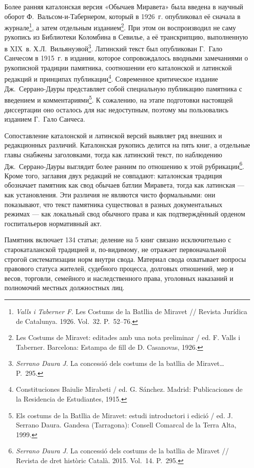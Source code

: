 Более ранняя каталонская версия «Обычаев Миравета» была введена в научный оборот Ф.~Вальсом-и-Табернером, который в 1926~г. опубликовал её сначала в журнале\footnote{\emph{Valls i Taberner F. }Les Costums de la Batllia de Miravet // Revista Jurídica de Catalunya. 1926. Vol.~32. P.~52--76.}, а затем отдельным изданием\footnote{Les Costums de Miravet: editades amb una nota preliminar / ed. F. Valls i Taberner. Barcelona: Estampa de fill de D. Casanovas, 1926.}. При этом он воспроизводил не саму рукопись из Библиотеки Коломбина в Севилье, а её транскрипцию, выполненную в XIX~в. Х.Л.~Вильянуэвой\footnote{\emph{Serrano Daura J. }La concessió dels costums de la batllia de Miravet… P.~295.}. Латинский текст был опубликован Г.~Гало Санчесом в 1915~г. в издании, которое сопровождалось вводными замечаниями о рукописной традиции памятника, соотношении его каталонской и латинской редакций и принципах публикации\footnote{Constituciones Baiulie Mirabeti / ed. G. Sánchez. Madrid: Publicaciones de la Residencia de Estudiantes, 1915.}. Современное критическое издание Дж.~Серрано-Дауры представляет собой специальную публикацию памятника с введением и комментариями\footnote{Els costums de la Batllia de Miravet: estudi introductori i edició / ed. J. Serrano Daura. Gandesa (Tarragona): Consell Comarcal de la Terra Alta, 1999.}. К сожалению, на этапе подготовки настоящей диссертации оно осталось для нас недоступным, поэтому мы пользовались изданием Г.~Гало Санчеса.

Сопоставление каталонской и латинской версий выявляет ряд внешних и редакционных различий. Каталонская рукопись делится на пять книг, а отдельные главы снабжены заголовками, тогда как латинский текст, по наблюдению Дж.~Серрано-Дауры выглядит более ранним по отношению к этой рубрикации\footnote{\emph{Serrano Daura J.} La concessió dels costums de la batllia de Miravet // Revista de dret històric Català. 2015. Vol.~14. P.~295.}. Кроме того, заглавия двух редакций не совпадают: каталонская традиция обозначает памятник как свод обычаев батлии Миравета, тогда как латинская --- как установления. Эти различия не являются чисто формальными: они показывают, что текст памятника существовал в разных документальных режимах --- как локальный свод обычного права и как подтверждённый орденом госпитальеров нормативный акт.

Памятник включает 134 статьи; деление на 5 книг связано исключительно с старокаталанской традицией и, по-видимому, не отражает первоначальной строгой систематизации норм внутри свода. Материал свода охватывает вопросы правового статуса жителей, судебного процесса, долговых отношений, мер и весов, торговли, семейного и наследственного права, уголовных наказаний и полномочий местных должностных лиц.

